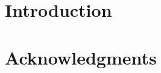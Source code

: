 \documentclass[times,twocolumn,final]{elsarticle}
\begin{document}
\section*{Introduction}


%

%
\newcommand{\specialcell}[2][c]{%
\begin{tabular}[#1]{@{}l@{}}#2\end{tabular}}




\makeatother

\section*{Acknowledgments}



\end{document}
